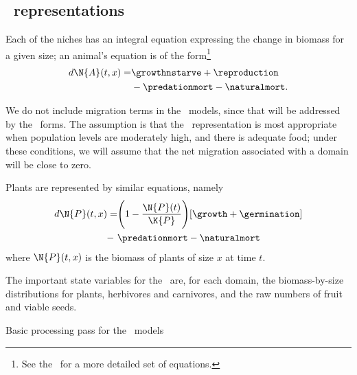 \subsection*{\SD\ rep\-re\-sen\-ta\-tions}

Each of the niches has an integral equation expressing the change in
biomass for a given size; an animal's equation is of the
form\footnote{See the \SuppMaterial\ for a more detailed set of
  equations.}
\begin{align*}
  d\N{A}(t,x) = & \growthnstarve + \reproduction \\
  & - \predationmort -\naturalmort.
\end{align*}

We do not include migration terms in the \SD\ models, since that will
be addressed by the \IB\ forms. The assumption is that the
\SD\ rep\-re\-sen\-ta\-tion is most appropriate when population levels are
moderately high, and there is adequate food; under these conditions,
we will assume that the net migration associated with a domain will be
close to zero.

Plants are represented by similar equations, namely
\begin{align*}
d\N{P}(t,x) = &\Biggl(1 - \frac{\N{P}(t)}{\K{P}}\Biggr)[\growth + \germination] \\- \
& \predationmort - \naturalmort
\end{align*}
where $\N{P}(t,x)$ is the biomass of plants of size $x$ at time $t$.


The important state variables for the \SD\ are, for each domain, the
biomass-by-size distributions for plants, herbivores and carnivores, and the
raw numbers of fruit and viable seeds. 

\begin{algorithm}\label{sdalg}
  \caption{Basic processing pass for the \SD\ models}
\begin{algorithmic}
  \EndFor
\end{algorithmic}   
\end{algorithm}

